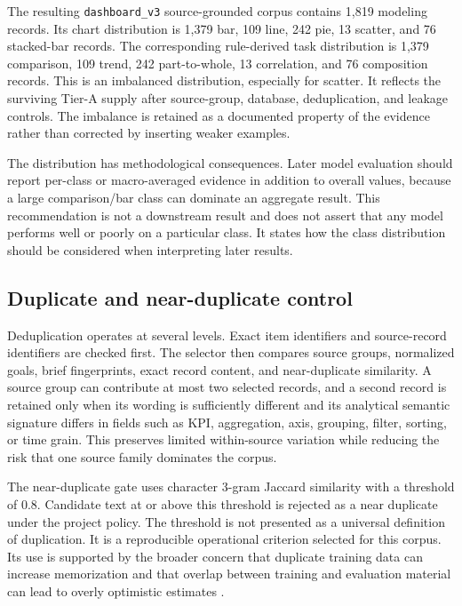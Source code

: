 The resulting \texttt{dashboard\_v3} source-grounded corpus contains 1,819 modeling records. Its chart distribution is 1,379 bar, 109 line, 242 pie, 13 scatter, and 76 stacked-bar records. The corresponding rule-derived task distribution is 1,379 comparison, 109 trend, 242 part-to-whole, 13 correlation, and 76 composition records. This is an imbalanced distribution, especially for scatter. It reflects the surviving Tier-A supply after source-group, database, deduplication, and leakage controls. The imbalance is retained as a documented property of the evidence rather than corrected by inserting weaker examples.

The distribution has methodological consequences. Later model evaluation should report per-class or macro-averaged evidence in addition to overall values, because a large comparison/bar class can dominate an aggregate result. This recommendation is not a downstream result and does not assert that any model performs well or poorly on a particular class. It states how the class distribution should be considered when interpreting later results.

\subsection{Duplicate and near-duplicate control}

Deduplication operates at several levels. Exact item identifiers and source-record identifiers are checked first. The selector then compares source groups, normalized goals, brief fingerprints, exact record content, and near-duplicate similarity. A source group can contribute at most two selected records, and a second record is retained only when its wording is sufficiently different and its analytical semantic signature differs in fields such as KPI, aggregation, axis, grouping, filter, sorting, or time grain. This preserves limited within-source variation while reducing the risk that one source family dominates the corpus.

The near-duplicate gate uses character 3-gram Jaccard similarity with a threshold of 0.8. Candidate text at or above this threshold is rejected as a near duplicate under the project policy. The threshold is not presented as a universal definition of duplication. It is a reproducible operational criterion selected for this corpus. Its use is supported by the broader concern that duplicate training data can increase memorization and that overlap between training and evaluation material can lead to overly optimistic estimates \cite{lee2022dedup}.

